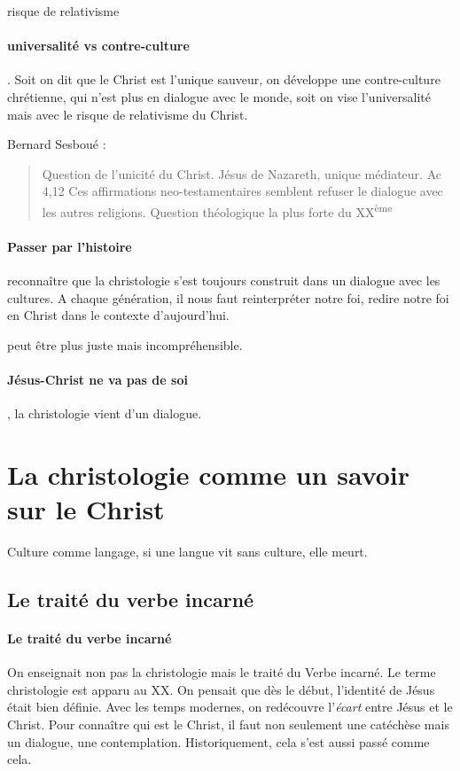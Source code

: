 risque de relativisme


\paragraph{universalité vs contre-culture}. Soit on dit que le Christ est l'unique sauveur, on développe une contre-culture chrétienne, qui n'est plus en dialogue avec le monde, soit on vise l'universalité mais avec le risque de relativisme du Christ.


Bernard Sesboué  :
\begin{quote}
    Question de l'unicité du Christ. Jésus de Nazareth, unique médiateur.
    Ac 4,12
    Ces affirmations neo-testamentaires semblent refuser le dialogue avec les autres religions.
    Question théologique la plus forte du XX\textsuperscript{ème}
\end{quote}

\paragraph{Passer par l'histoire} reconnaître que la christologie s'est toujours construit dans un dialogue avec les cultures. A chaque génération, il nous faut reinterpréter notre foi, redire notre foi en Christ dans le contexte d'aujourd'hui.

\begin{Ex}[Consubstantiel]
peut être plus juste mais incompréhensible.
\end{Ex}

\paragraph{Jésus-Christ ne va pas de soi}, la christologie vient d'un dialogue.

\section{La christologie comme un savoir sur le Christ}

Culture comme langage, si une langue vit sans culture, elle meurt.

\subsection{Le traité du verbe incarné}
\paragraph{Le traité du verbe incarné} On enseignait non pas la christologie mais le traité du Verbe incarné. Le terme christologie est apparu au XX. On pensait que dès le début, l'identité de Jésus était bien définie. Avec les temps modernes, on redécouvre l'\textit{écart} entre Jésus et le Christ. Pour connaître qui est le Christ, il faut non seulement une catéchèse mais un dialogue, une contemplation. Historiquement, cela s'est aussi passé comme cela.

